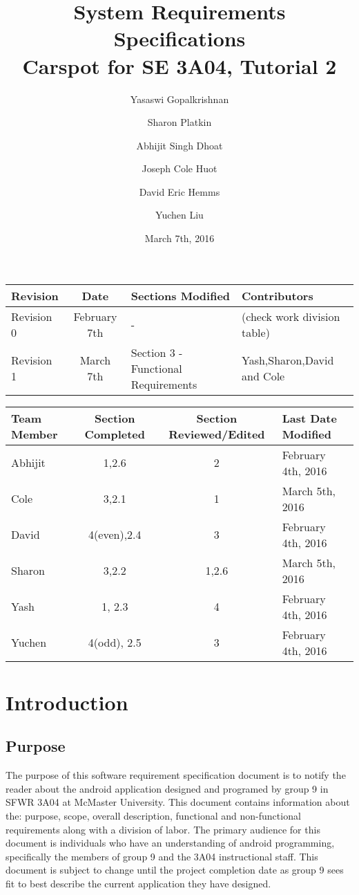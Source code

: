 \documentclass[12pt]{article}
\title{System Requirements Specifications\\
	\large Carspot for SE 3A04, Tutorial 2}
\author{
         Yasaswi Gopalkrishnan\\ \newline
         \and
         Sharon Platkin \\ \newline
         \and
         Abhijit Singh Dhoat\\ \newline
         \and
         Joseph Cole Huot\\ \newline
         \and
         David Eric Hemms\\ \newline
         \and
         Yuchen Liu\\ \newline
    }
\date{March 7th, 2016}
\begin{document}
\maketitle
\newpage
\tableofcontents
\listoftables
\newpage


\begin{table}[h!]
\caption{Revision History}
\begin{longtable}{ | l | c | p{4cm} | p{4cm} |}
	\hline
	Revision & Date & Sections Modified & Contributors\\ \hline
	Revision 0 & February 7th & - & (check work division table)\\ \hline
	Revision 1 & March 7th & Section 3 - Functional Requirements & Yash,Sharon,David and Cole\\ \hline
\end{longtable}
\end{table}

\begin{table}[h!]
\caption{Work Division}
\begin{longtable}{ | l | c | c | p{4cm} |}
	\hline
	Team Member & Section Completed & Section Reviewed/Edited & Last Date Modified \\ \hline
	Abhijit & 1,2.6 & 2 & February 4th, 2016\\ \hline
	Cole & 3,2.1 & 1 & March 5th, 2016\\ \hline
	David & 4(even),2.4 & 3 & February 4th, 2016\\ \hline
	Sharon & 3,2.2 & 1,2.6 & March 5th, 2016\\ \hline
	Yash & 1, 2.3 & 4 & February 4th, 2016\\ \hline
	Yuchen & 4(odd), 2.5 & 3 & February 4th, 2016\\ \hline
\end{longtable}
\end{table}

\newpage

\section{Introduction}
\subsection{Purpose}
The purpose of this software requirement specification document is to notify the reader about the android application designed and programed by group 9 in SFWR 3A04 at McMaster University. This document contains information about the: purpose, scope, overall description, functional and non-functional requirements along with a division of labor. The primary audience for this document is individuals who have an understanding of android programming, specifically the members of group 9 and the 3A04 instructional staff. This document is subject to change until the project completion date as group 9 sees fit to best describe the current application they have designed.
\end{document}
